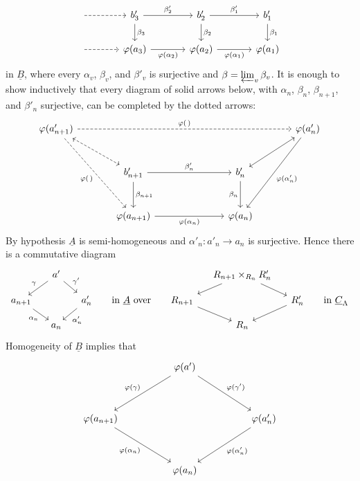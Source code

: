 \[
\begin{tikzcd}[column sep=large]
 {} \arrow[r,dashed] & b'_3 \arrow[r,"{\beta'_2}"] \arrow[d,"{\beta_3}"]
 & b'_2 \arrow[r,"{\beta'_1}"] \arrow[d,"{\beta_2}"]
 & b'_1 \arrow[d,"{\beta_1}"]\\
 {} \arrow[r,dashed] & \varphi(a_3) \arrow[r,"{\varphi(\alpha_2)}"']
 & \varphi(a_2) \arrow[r,"{\varphi(\alpha_1)}"']
 & \varphi(a_1)
\end{tikzcd}
\]
in $\underline B$, where every $\alpha_v$, $\beta_v$, and
$\beta'_v$ is surjective and
$\beta=\varprojlim_v\beta_v$. It is enough to show inductively that
every diagram of solid arrows below, with
$\alpha_n$, $\beta_n$, $\beta_{n+1}$, and $\beta'_n$ surjective,
can be completed by the dotted arrows:
\[
\begin{tikzcd}[column sep=large,row sep=large]
 \varphi(a'_{n+1})
   \arrow[rrrr,dashed,"{\varphi(\,)}"]
   \arrow[dr,dashed,leftrightarrow]
   \arrow[ddr,dashed,"{\varphi(\,)}"']
 &&&& \varphi(a'_n)
   \arrow[dl,leftrightarrow]
   \arrow[ddl,"{\varphi(\alpha'_n)}"]\\
 & b'_{n+1} \arrow[rr,"{\beta'_n}"] \arrow[d,"{\beta_{n+1}}"]
 && b'_n \arrow[d,"{\beta_n}"'] &\\
 & \varphi(a_{n+1}) \arrow[rr,"{\varphi(\alpha_n)}"']
 && \varphi(a_n) &
\end{tikzcd}
\]
By hypothesis $\underline A$ is semi-homogeneous and
$\alpha'_n:a'_{n}\longrightarrow a_n$ is surjective. Hence there is
a commutative diagram
\[
\begin{tikzcd}[column sep=small,row sep=small]
 & a' \arrow[dl,"{\gamma}"'] \arrow[dr,"{\gamma'}"] &
 &&& R_{n+1}\times_{R_n}R'_n \arrow[dl] \arrow[dr] &\\
 a_{n+1} \arrow[dr,"{\alpha_n}"'] &&
 a'_n \arrow[dl,"{\alpha'_n}"]
 & \text{in $\underline A$ over} &
 R_{n+1} \arrow[dr] && R'_n \arrow[dl]
 & \text{in $\underline C_\Lambda$}\\
 & a_n &&&& R_n &&
\end{tikzcd}
\]
Homogeneity of $\underline B$ implies that
\[
\begin{tikzcd}[column sep=huge,row sep=huge]
 & \varphi(a') \arrow[dl,"{\varphi(\gamma)}"']
                  \arrow[dr,"{\varphi(\gamma')}"] &\\
 \varphi(a_{n+1}) \arrow[dr,"{\varphi(\alpha_n)}"']
 && \varphi(a'_n) \arrow[dl,"{\varphi(\alpha'_n)}"]\\
 & \varphi(a_n) &
\end{tikzcd}
\]



